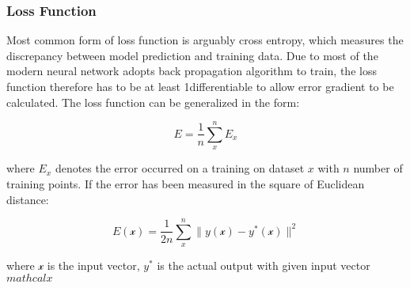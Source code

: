 \subsubsection{Loss Function}

Most common form of loss function is arguably cross entropy, which measures the discrepancy between model prediction and training data. Due to most of the modern neural network adopts back propagation algorithm to train, the loss function therefore has to be at least 1\textdegree differentiable to allow error gradient to be calculated. The loss function can be generalized in the form:

\begin{equation}
    E = \frac {1}{n} \sum_x^n E_x
\end{equation}

where $E_x$ denotes the error occurred on a training on dataset $x$ with $n$ number of training points. If the error has been measured in the square of Euclidean distance:

\begin{equation}
    E(\mathcal{x}) = \frac {1}{2n} \sum_x^n \parallel y(\mathcal{x}) - y^*(\mathcal{x}) \parallel^2 
\end{equation}

where $\mathcal{x}$ is the input vector, $y^*$ is the actual output with given input vector $mathcal{x}$
\par 
